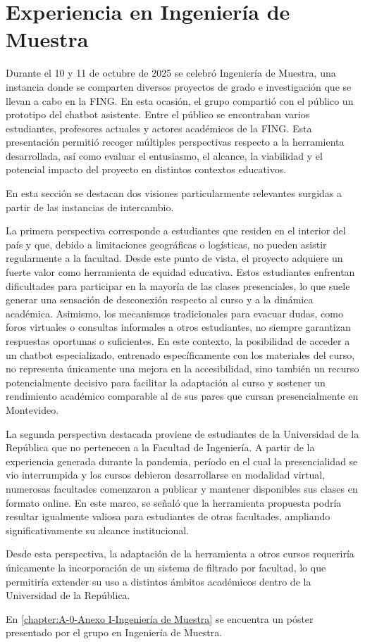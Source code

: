 \section{Experiencia en Ingeniería de Muestra}
\label{section:6-IngenieriaMuestra}

Durante el 10 y 11 de octubre de 2025 se celebró Ingeniería de Muestra, una instancia donde se comparten diversos proyectos de grado e investigación que se llevan a cabo en la FING. En esta ocasión, el grupo compartió con el público un prototipo del chatbot asistente. Entre el público se encontraban varios estudiantes, profesores actuales y actores académicos de la FING.
Esta presentación permitió recoger múltiples perspectivas respecto a la herramienta desarrollada, así como evaluar el entusiasmo, el alcance, la viabilidad y el potencial impacto del proyecto en distintos contextos educativos.

En esta sección se destacan dos visiones particularmente relevantes surgidas a partir de las instancias de intercambio.

La primera perspectiva corresponde a estudiantes que residen en el interior del país y que, debido a limitaciones geográficas o logísticas, no pueden asistir regularmente a la facultad. Desde este punto de vista, el proyecto adquiere un fuerte valor como herramienta de equidad educativa. Estos estudiantes enfrentan dificultades para participar en la mayoría de las clases presenciales, lo que suele generar una sensación de desconexión respecto al curso y a la dinámica académica. Asimismo, los mecanismos tradicionales para evacuar dudas, como foros virtuales o consultas informales a otros estudiantes, no siempre garantizan respuestas oportunas o suficientes. En este contexto, la posibilidad de acceder a un chatbot especializado, entrenado específicamente con los materiales del curso, no representa únicamente una mejora en la accesibilidad, sino también un recurso potencialmente decisivo para facilitar la adaptación al curso y sostener un rendimiento académico comparable al de sus pares que cursan presencialmente en Montevideo.

La segunda perspectiva destacada proviene de estudiantes de la Universidad de la República que no pertenecen a la Facultad de Ingeniería. A partir de la experiencia generada durante la pandemia, período en el cual la presencialidad se vio interrumpida y los cursos debieron desarrollarse en modalidad virtual, numerosas facultades comenzaron a publicar y mantener disponibles sus clases en formato online. En este marco, se señaló que la herramienta propuesta podría resultar igualmente valiosa para estudiantes de otras facultades, ampliando significativamente su alcance institucional.

Desde esta perspectiva, la adaptación de la herramienta a otros cursos requeriría únicamente la incorporación de un sistema de filtrado por facultad, lo que permitiría extender su uso a distintos ámbitos académicos dentro de la Universidad de la República.

En \autoref{chapter:A-0-Anexo I-Ingeniería de Muestra} se encuentra un póster presentado por el grupo en Ingeniería de Muestra.